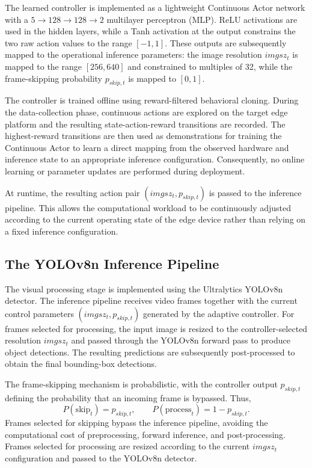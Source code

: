 \documentclass{ieeeaccess}
\begin{document}
The learned controller is implemented as a lightweight Continuous Actor
network with a $5 \rightarrow 128 \rightarrow 128 \rightarrow 2$ multilayer
perceptron (MLP). ReLU activations are used in the hidden layers, while a
Tanh activation at the output constrains the two raw action values to the
range $[-1,1]$. These outputs are subsequently mapped to the operational
inference parameters: the image resolution $imgsz_t$ is mapped to the range
$[256,640]$ and constrained to multiples of 32, while the frame-skipping
probability $p_{skip,t}$ is mapped to $[0,1]$.

The controller is trained offline using reward-filtered behavioral cloning.
During the data-collection phase, continuous actions are explored on the
target edge platform and the resulting state-action-reward transitions are
recorded. The highest-reward transitions are then used as demonstrations for
training the Continuous Actor to learn a direct mapping from the observed
hardware and inference state to an appropriate inference configuration.
Consequently, no online learning or parameter updates are performed during
deployment.

At runtime, the resulting action pair $(imgsz_t,p_{skip,t})$ is passed to the
inference pipeline. This allows the computational workload to be continuously
adjusted according to the current operating state of the edge device rather
than relying on a fixed inference configuration.

\subsection{The YOLOv8n Inference Pipeline}

The visual processing stage is implemented using the Ultralytics YOLOv8n
detector. The inference pipeline receives video frames together with the
current control parameters $(imgsz_t, p_{skip,t})$ generated by the adaptive
controller. For frames selected for processing, the input image is resized to
the controller-selected resolution $imgsz_t$ and passed through the YOLOv8n
forward pass to produce object detections. The resulting predictions are
subsequently post-processed to obtain the final bounding-box detections.

The frame-skipping mechanism is probabilistic, with the controller output
$p_{skip,t}$ defining the probability that an incoming frame is bypassed.
Thus,
\begin{equation}
P(\mathrm{skip}_t) = p_{skip,t},
\qquad
P(\mathrm{process}_t) = 1-p_{skip,t}.
\end{equation}
Frames selected for skipping bypass the inference pipeline, avoiding the
computational cost of preprocessing, forward inference, and post-processing.
Frames selected for processing are resized according to the current
$imgsz_t$ configuration and passed to the YOLOv8n detector.
\end{document}
